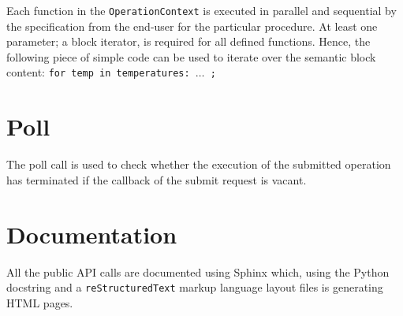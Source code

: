Each function in the \texttt{OperationContext} is executed in parallel and sequential by the specification from the end-user for the particular procedure. At least one parameter; a block iterator, is required for all defined functions. Hence, the following piece of simple code can be used to iterate over the semantic block content: \texttt{for temp in temperatures: $\ldots$ ;}

\section{Poll}
The poll call is used to check whether the execution of the submitted operation has terminated if the callback of the submit request is vacant.

\section{Documentation}
All the public API calls are documented using Sphinx \cite{PageSphinx} which, using the Python docstring and a \texttt{reStructuredText} markup language layout files is generating HTML pages.
